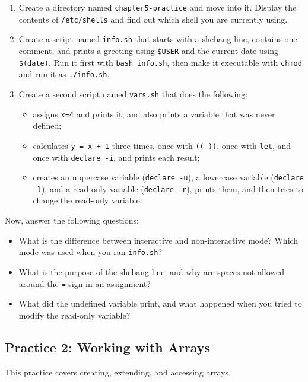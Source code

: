 \begin{enumerate}
    \item Create a directory named \texttt{chapter5-practice} and move into it. Display the contents of \texttt{/etc/shells} and find out which shell you are currently using.
    \item Create a script named \texttt{info.sh} that starts with a shebang line, contains one comment, and prints a greeting using \texttt{\$USER} and the current date using \texttt{\$(date)}. Run it first with \texttt{bash info.sh}, then make it executable with \texttt{chmod} and run it as \texttt{./info.sh}.
    \item Create a second script named \texttt{vars.sh} that does the following:
    \begin{itemize}
        \item assigns \texttt{x=4} and prints it, and also prints a variable that was never defined;
        \item calculates \texttt{y = x + 1} three times, once with \texttt{(( ))}, once with \texttt{let}, and once with \texttt{declare -i}, and prints each result;
        \item creates an uppercase variable (\texttt{declare -u}), a lowercase variable (\texttt{declare -l}), and a read-only variable (\texttt{declare -r}), prints them, and then tries to change the read-only variable.
    \end{itemize}
\end{enumerate}

Now, answer the following questions:
\begin{itemize}
    \item What is the difference between interactive and non-interactive mode? Which mode was used when you ran \texttt{info.sh}?
    \item What is the purpose of the shebang line, and why are spaces not allowed around the \texttt{=} sign in an assignment?
    \item What did the undefined variable print, and what happened when you tried to modify the read-only variable?
\end{itemize}

\subsection{Practice 2: Working with Arrays}
This practice covers creating, extending, and accessing arrays.

